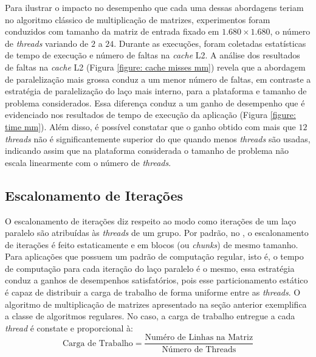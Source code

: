 \documentclass{SBCbookchapter}
\begin{document}
		Para ilustrar o impacto no desempenho que cada uma dessas
		abordagens teriam no algoritmo clássico de multiplicação de
		matrizes, experimentos foram conduzidos com tamanho da matriz de
		entrada fixado em $1.680 \times 1.680$, o número de \textit{threads} 
		variando de $2$ a $24$. Durante as execuções, foram coletadas estatísticas
		de tempo de execução e número de faltas na \textit{cache} L2.  A análise
		dos resultados de faltas na \textit{cache} L2 (Figura \ref{figure: cache misses
		mm}) revela que a abordagem de paralelização mais grossa conduz
		a um menor número de faltas, em contraste a estratégia de
		paralelização do laço mais interno, para a plataforma e tamanho
		de problema considerados. Essa diferença conduz a um ganho de
		desempenho que é evidenciado nos resultados de tempo de execução
		da aplicação (Figura \ref{figure: time mm}). Além disso, é
		possível constatar que o ganho obtido com mais que $12$
		\textit{threads} não é significantemente superior do que quando
		menos \textit{threads} são usadas, indicando assim que na
		plataforma considerada o tamanho de problema não escala
		linearmente com o número de \textit{threads}.

	\subsection{Escalonamento de Iterações}
	\label{subsection: escalonamento de iteracoes}

		O escalonamento de iterações diz respeito ao modo como iterações
		de um laço paralelo são atribuídas às \textit{threads} de um
		grupo. Por padrão, no \openmp, o escalonamento de iterações é
		feito estaticamente e em blocos (ou \textit{chunks}) de mesmo
		tamanho. Para aplicações que possuem um padrão de computação
		regular, isto é, o tempo de computação para cada iteração do
		laço paralelo é o mesmo, essa estratégia conduz a ganhos de
		desempenhos satisfatórios, pois esse particionamento estático é
		capaz de distribuir a carga de trabalho de forma uniforme entre
		as \textit{threads}. O algoritmo de multiplicação de matrizes
		apresentado na seção anterior exemplifica a classe de algoritmos
		regulares. No caso, a carga de trabalho entregue a cada
		\textit{thread} é constate e proporcional à:
		\begin{equation}
			\text{Carga de Trabalho} = \dfrac{\text{Numéro de Linhas na Matriz}}%
			                                 {\text{Número de Threads}}
		\end{equation}
\end{document}
